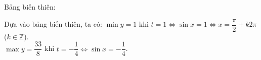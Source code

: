 \begin{vd}
{\begin{enumerate}[a)]
		Bảng biến thiên:
		\begin{center}
		\end{center}
		
		Dựa vào bảng biến thiên, ta có:
		$\min y = 1$ khi $t = 1 \Leftrightarrow \sin x = 1 \Leftrightarrow x = \dfrac{\pi}{2} + k2\pi$ ($k \in \mathbb{Z}$).\\
		$\max y = \dfrac{33}{8}$ khi $t = -\dfrac{1}{4} \Leftrightarrow \sin x = -\dfrac{1}{4}$.
	\end{enumerate}
}
\end{vd} 

